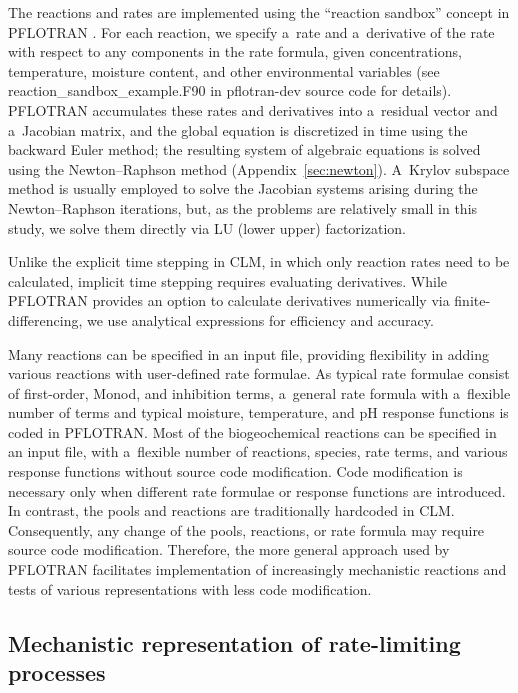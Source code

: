 \documentclass[gmd,noline]{copernicus}
\begin{document}
      The reactions and rates are implemented using the ``reaction sandbox''
      concept in PFLOTRAN \citep{Lichtner2015}. For each reaction, we
      specify a~rate and a~derivative of the rate with respect to any
      components in the rate formula, given concentrations, temperature,
      moisture content, and other environmental variables (see
      reaction\_sandbox\_example.F90 in pflotran-dev source code for
      details). PFLOTRAN accumulates these rates and derivatives into
      a~residual vector and a~Jacobian matrix, and the global equation is
      discretized in time using the backward Euler method; the resulting
      system of algebraic equations is solved using the Newton--Raphson
      method (Appendix~\ref{sec:newton}).  A~Krylov subspace method is
      usually employed to solve the Jacobian systems arising during the
      Newton--Raphson iterations, but, as the problems are relatively small
      in this study, we solve them directly via LU (lower upper)
      factorization.

      Unlike the explicit time stepping in CLM, in which only reaction rates
      need to be calculated, implicit time stepping requires evaluating
      derivatives.  While PFLOTRAN provides an option to calculate
      derivatives numerically via finite-differencing, we use analytical
      expressions for efficiency and accuracy.

      Many reactions can be specified in an input file, providing
      flexibility in adding various reactions with user-defined rate
      formulae. As typical rate formulae consist of first-order, Monod, and
      inhibition terms, a~general rate formula with a~flexible number of
      terms and typical moisture, temperature, and pH response functions is
      coded in PFLOTRAN. Most of the biogeochemical reactions can be
      specified in an input file, with a~flexible number of reactions,
      species, rate terms, and various response functions without source
      code modification.  Code modification is necessary only when different
      rate formulae or response functions are introduced. In contrast, the
        pools and reactions are traditionally hardcoded in
      CLM. Consequently, any change of the pools, reactions, or rate formula
      may require source code modification. Therefore, the more general
      approach used by PFLOTRAN facilitates implementation of increasingly
      mechanistic reactions and tests of various representations with less
      code modification.


\subsection{Mechanistic representation of rate-limiting processes}%
\end{document}
